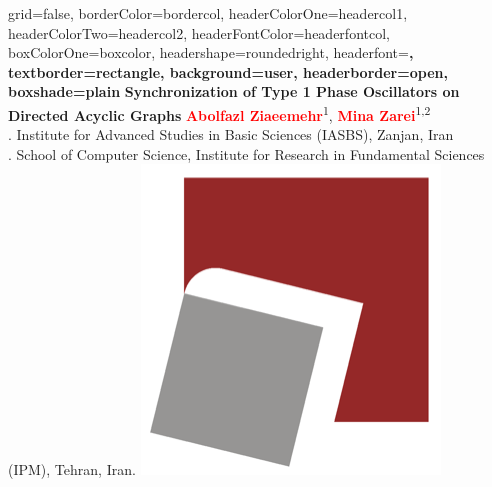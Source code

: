 \documentclass[a0paper,portrait]{baposter}
\begin{document}
\begin{poster}{
grid=false,
borderColor=bordercol, %
headerColorOne=headercol1, %
headerColorTwo=headercol2, %
headerFontColor=headerfontcol, %
boxColorOne=boxcolor, %
headershape=roundedright, %
headerfont=\Large\sf\bf, %
textborder=rectangle,
background=user,
headerborder=open, %
boxshade=plain
}
{}
%
%
{\sf\bf Synchronization of Type 1 Phase Oscillators on Directed Acyclic Graphs} %
{\vspace{-0.2em} \smaller \textbf{\textcolor{red}{Abolfazl Ziaeemehr}}\textsuperscript{1}, 
	\textbf{\textcolor{red}{Mina Zarei}}\textsuperscript{1,2}\\ %
{. Institute for Advanced Studies in Basic Sciences (IASBS), Zanjan, Iran} \\
{. School of Computer Science, Institute for Research in Fundamental Sciences (IPM), Tehran, Iran.}
} %
{\includegraphics[scale=0.25]{logo}} %



\end{poster}
\end{document}
